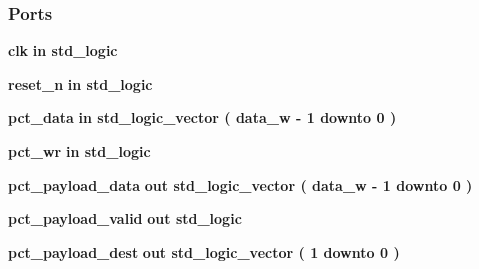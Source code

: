 \subsubsection*{Ports}
 \begin{DoxyCompactItemize}
\item 
{\bf clk}  {\bfseries {\bfseries \textcolor{keywordflow}{in}\textcolor{vhdlchar}{ }}} {\bfseries \textcolor{comment}{std\+\_\+logic}\textcolor{vhdlchar}{ }} 
\item 
{\bf reset\+\_\+n}  {\bfseries {\bfseries \textcolor{keywordflow}{in}\textcolor{vhdlchar}{ }}} {\bfseries \textcolor{comment}{std\+\_\+logic}\textcolor{vhdlchar}{ }} 
\item 
{\bf pct\+\_\+data}  {\bfseries {\bfseries \textcolor{keywordflow}{in}\textcolor{vhdlchar}{ }}} {\bfseries \textcolor{comment}{std\+\_\+logic\+\_\+vector}\textcolor{vhdlchar}{ }\textcolor{vhdlchar}{(}\textcolor{vhdlchar}{ }\textcolor{vhdlchar}{ }\textcolor{vhdlchar}{ }\textcolor{vhdlchar}{ }{\bfseries {\bf data\+\_\+w}} \textcolor{vhdlchar}{-\/}\textcolor{vhdlchar}{ } \textcolor{vhdldigit}{1} \textcolor{vhdlchar}{ }\textcolor{keywordflow}{downto}\textcolor{vhdlchar}{ }\textcolor{vhdlchar}{ } \textcolor{vhdldigit}{0} \textcolor{vhdlchar}{ }\textcolor{vhdlchar}{)}\textcolor{vhdlchar}{ }} 
\item 
{\bf pct\+\_\+wr}  {\bfseries {\bfseries \textcolor{keywordflow}{in}\textcolor{vhdlchar}{ }}} {\bfseries \textcolor{comment}{std\+\_\+logic}\textcolor{vhdlchar}{ }} 
\item 
{\bf pct\+\_\+payload\+\_\+data}  {\bfseries {\bfseries \textcolor{keywordflow}{out}\textcolor{vhdlchar}{ }}} {\bfseries \textcolor{comment}{std\+\_\+logic\+\_\+vector}\textcolor{vhdlchar}{ }\textcolor{vhdlchar}{(}\textcolor{vhdlchar}{ }\textcolor{vhdlchar}{ }\textcolor{vhdlchar}{ }\textcolor{vhdlchar}{ }{\bfseries {\bf data\+\_\+w}} \textcolor{vhdlchar}{-\/}\textcolor{vhdlchar}{ } \textcolor{vhdldigit}{1} \textcolor{vhdlchar}{ }\textcolor{keywordflow}{downto}\textcolor{vhdlchar}{ }\textcolor{vhdlchar}{ } \textcolor{vhdldigit}{0} \textcolor{vhdlchar}{ }\textcolor{vhdlchar}{)}\textcolor{vhdlchar}{ }} 
\item 
{\bf pct\+\_\+payload\+\_\+valid}  {\bfseries {\bfseries \textcolor{keywordflow}{out}\textcolor{vhdlchar}{ }}} {\bfseries \textcolor{comment}{std\+\_\+logic}\textcolor{vhdlchar}{ }} 
\item 
{\bf pct\+\_\+payload\+\_\+dest}  {\bfseries {\bfseries \textcolor{keywordflow}{out}\textcolor{vhdlchar}{ }}} {\bfseries \textcolor{comment}{std\+\_\+logic\+\_\+vector}\textcolor{vhdlchar}{ }\textcolor{vhdlchar}{(}\textcolor{vhdlchar}{ }\textcolor{vhdlchar}{ } \textcolor{vhdldigit}{1} \textcolor{vhdlchar}{ }\textcolor{keywordflow}{downto}\textcolor{vhdlchar}{ }\textcolor{vhdlchar}{ } \textcolor{vhdldigit}{0} \textcolor{vhdlchar}{ }\textcolor{vhdlchar}{)}\textcolor{vhdlchar}{ }} 
\end{DoxyCompactItemize}


